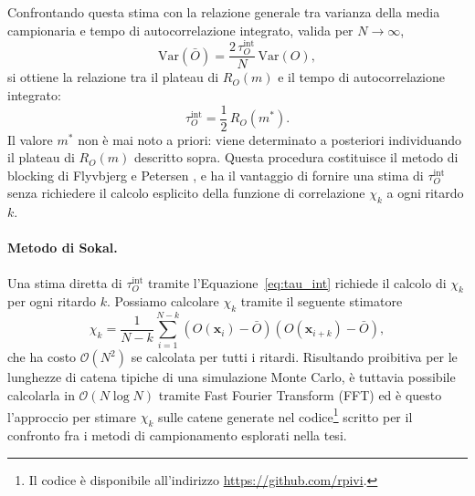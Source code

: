 Confrontando questa stima con la relazione generale tra varianza della media campionaria e tempo di autocorrelazione integrato, valida per $N\to\infty$,
\begin{equation}
    \mathrm{Var}(\bar O) = \frac{2\,\tau^{\mathrm{int}}_O}{N}\, \mathrm{Var}(O),
\end{equation}
si ottiene la relazione tra il plateau di $R_O(m)$ e il tempo di autocorrelazione integrato:
\begin{equation}
    \label{eq:tau_int_blocking}
    \tau^{\mathrm{int}}_O = \frac{1}{2}\, R_O(m^*).
\end{equation}
Il valore $m^*$ non è mai noto a priori: viene determinato a posteriori individuando il plateau di $R_O(m)$ descritto sopra. Questa procedura costituisce il metodo di blocking di Flyvbjerg e Petersen \cite{flyvbjerg1989error}, e ha il vantaggio di fornire una stima di $\tau^{\mathrm{int}}_O$ senza richiedere il calcolo esplicito della funzione di correlazione $\chi_k$ a ogni ritardo $k$.

\paragraph*{Metodo di Sokal.}

Una stima diretta di $\tau^{\mathrm{int}}_O$ tramite l'Equazione~\ref{eq:tau_int} richiede il calcolo di $\chi_k$ per ogni ritardo $k$. Possiamo calcolare $\chi_k$ tramite il seguente stimatore
\begin{equation}
    \chi_k = \frac{1}{N-k}\sum_{i=1}^{N-k} \left(O(\mathbf{x}_i)-\bar{O}\right)\left(O(\mathbf{x}_{i+k})-\bar{O}\right),
\end{equation} 
che ha costo $\mathcal{O}(N^2)$ se calcolata per tutti i ritardi. Risultando proibitiva per le lunghezze di catena tipiche di una simulazione Monte Carlo, è tuttavia possibile calcolarla in $\mathcal{O}(N\log N)$ tramite Fast Fourier Transform (FFT) ed è questo l'approccio per stimare $\chi_k$ sulle catene generate nel codice\footnote{Il codice è disponibile all'indirizzo \url{https://github.com/rpivi}.} scritto per il confronto fra i metodi di campionamento esplorati nella tesi.

